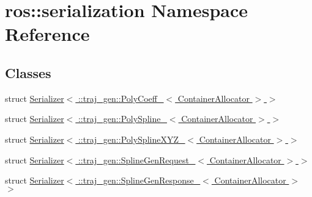 \hypertarget{namespaceros_1_1serialization}{}\section{ros\+:\+:serialization Namespace Reference}
\label{namespaceros_1_1serialization}
\subsection*{Classes}
\begin{DoxyCompactItemize}
\item 
struct \hyperlink{structros_1_1serialization_1_1_serializer_3_01_1_1traj__gen_1_1_poly_coeff___3_01_container_allocator_01_4_01_4}{Serializer$<$ \+::traj\+\_\+gen\+::\+Poly\+Coeff\+\_\+$<$ Container\+Allocator $>$ $>$}
\item 
struct \hyperlink{structros_1_1serialization_1_1_serializer_3_01_1_1traj__gen_1_1_poly_spline___3_01_container_allocator_01_4_01_4}{Serializer$<$ \+::traj\+\_\+gen\+::\+Poly\+Spline\+\_\+$<$ Container\+Allocator $>$ $>$}
\item 
struct \hyperlink{structros_1_1serialization_1_1_serializer_3_01_1_1traj__gen_1_1_poly_spline_x_y_z___3_01_container_allocator_01_4_01_4}{Serializer$<$ \+::traj\+\_\+gen\+::\+Poly\+Spline\+X\+Y\+Z\+\_\+$<$ Container\+Allocator $>$ $>$}
\item 
struct \hyperlink{structros_1_1serialization_1_1_serializer_3_01_1_1traj__gen_1_1_spline_gen_request___3_01_container_allocator_01_4_01_4}{Serializer$<$ \+::traj\+\_\+gen\+::\+Spline\+Gen\+Request\+\_\+$<$ Container\+Allocator $>$ $>$}
\item 
struct \hyperlink{structros_1_1serialization_1_1_serializer_3_01_1_1traj__gen_1_1_spline_gen_response___3_01_container_allocator_01_4_01_4}{Serializer$<$ \+::traj\+\_\+gen\+::\+Spline\+Gen\+Response\+\_\+$<$ Container\+Allocator $>$ $>$}
\end{DoxyCompactItemize}
